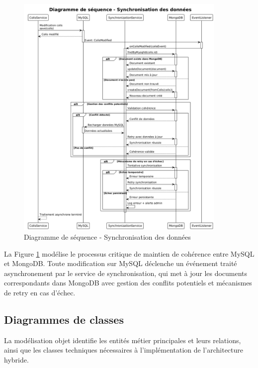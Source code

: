 \begin{figure}[H]
\centering
\includegraphics[width=0.9\textwidth]{images/sequence_synchronisation.png}
\caption{Diagramme de séquence - Synchronisation des données}
\label{fig:sequence_synchronisation}
\end{figure}
La Figure \ref{fig:sequence_synchronisation} modélise le processus critique de maintien de cohérence entre MySQL et MongoDB. Toute modification sur MySQL déclenche un événement traité asynchronement par le service de synchronisation, qui met à jour les documents correspondants dans MongoDB avec gestion des conflits potentiels et mécanismes de retry en cas d'échec.

\subsection{Diagrammes de classes}

La modélisation objet identifie les entités métier principales et leurs relations, ainsi que les classes techniques nécessaires à l'implémentation de l'architecture hybride.

